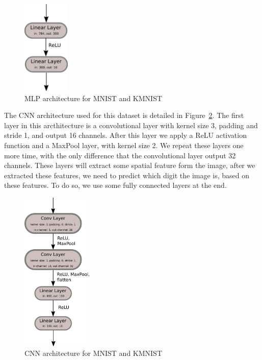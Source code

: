 \documentclass[english,preprint,JIP]{ipsj}
\begin{document}
\begin{figure}
    \centering
    \includegraphics[width=0.2\textwidth]{img/mnist_mlp.png}
    \caption{MLP architecture for MNIST and KMNIST}
    \label{fig:mnist_mlp_arch}
\end{figure}

The CNN architecture used for this dataset is detailed in
Figure~\ref{fig:mnist_cnn_arch}. The first layer in this arcthitecture is a
convolutional layer with kernel size 3, padding and stride 1, and output 16
channels. After this layer we apply a ReLU activation function and a MaxPool
layer, with kernel size 2. We repeat these layers one more time, with the only
difference that the convolutional layer output 32 channels. These layers will
extract some spatial feature form the image, after we extracted these features,
we need to predict which digit the image is, based on these features. To do so,
we use some fully connected layers at the end.

\begin{figure}
    \centering
    \includegraphics[width=0.3\textwidth]{img/mnist_cnn.png}
    \caption{CNN architecture for MNIST and KMNIST}
    \label{fig:mnist_cnn_arch}
\end{figure}
\end{document}
